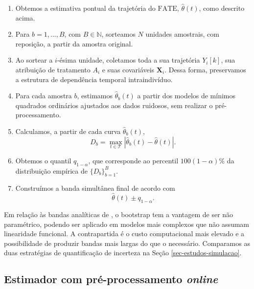 \begin{estimatorboxB}
\begin{enumerate}
    \item Obtemos a estimativa pontual da trajetória do \(\mathrm{FATE}\), \(\hat{\theta}(t)\), como descrito acima.
    \item Para \(b = 1, \dots, B\), com \(B \in \mathbb{N}\), sorteamos \(N\) unidades amostrais, com reposição, a partir da amostra original.
    \item Ao sortear a \(i\)-ésima unidade, coletamos toda a sua trajetória \(Y_i[k]\), sua atribuição de tratamento \(A_i\) e suas covariáveis \(\mathbf{X}_i\). 
    Dessa forma, preservamos a estrutura de dependência temporal intraindivíduo.
    \item Para cada amostra \(b\), estimamos \(\hat{\theta}_b(t)\) a partir dos modelos de mínimos quadrados ordinários ajustados aos dados ruidosos, sem realizar o pré-processamento.
    \item Calculamos, a partir de cada curva \(\hat{\theta}_b(t)\),
\begin{equation}
            D_b = \max_{t \in \mathcal{T}} \left|\hat{\theta}_b(t) - \hat{\theta}(t)\right|.
            \label{eq:Db_bootstrap}
        \end{equation}
    \item Obtemos o quantil \(q_{1-\alpha}\), que corresponde ao percentil \(100(1-\alpha)\%\) da distribuição empírica de \(\{D_b\}_{b=1}^{B}\).
    \item Construímos a banda simultânea final de acordo com
\begin{equation}
            \hat{\theta}(t) \pm q_{1-\alpha}.
            \label{eq:banda_bootstrap}
        \end{equation}
\end{enumerate}
\end{estimatorboxB}

Em relação às bandas analíticas de , o bootstrap tem a vantagem de ser não paramétrico, podendo ser aplicado em modelos mais complexos que não assumam linearidade funcional. 
A contrapartida é o custo computacional mais elevado e a possibilidade de produzir bandas mais largas do que o necessário. 
Comparamos as duas estratégias de quantificação de incerteza na Seção \ref{sec-estudos-simulacao}.

\subsection{Estimador com pré-processamento \emph{online}}\label{sec-estimador-online}

